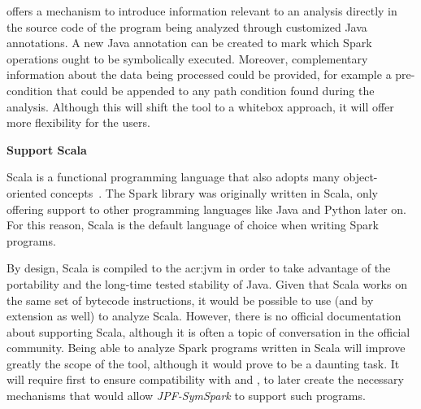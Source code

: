 \jpf{} offers a mechanism to introduce information relevant to an analysis directly in the source code of the program being analyzed through customized Java annotations. A new Java annotation can be created to mark which Spark operations ought to be symbolically executed. Moreover, complementary information about the data being processed could be provided, for example a pre-condition that could be appended to any path condition found during the analysis. Although this will shift the tool to a whitebox approach, it will offer more flexibility for the users. 

\textbf{Support Scala}

Scala is a functional programming language that also adopts many object-oriented concepts~\cite{WebScala2017}. The Spark library was originally written in Scala, only offering support to other programming languages like Java and Python later on. For this reason, Scala is the default language of choice when writing Spark programs. 

By design, Scala is compiled to the \acrlong{acr:jvm} in order to take advantage of the portability and the long-time tested stability of Java. Given that Scala works on the same set of bytecode instructions, it would be possible to use \jpf{} (and by extension \spf{} as well) to analyze Scala. However, there is no official documentation about \jpf{} supporting Scala, although it is often a topic of conversation in the official \jpf{} community. Being able to analyze Spark programs written in Scala will improve greatly the scope of the tool, although it would prove to be a daunting task. It will require first to ensure compatibility with \jpf{} and \spf{}, to later create the necessary mechanisms that would allow \textit{JPF-SymSpark} to support such programs.
